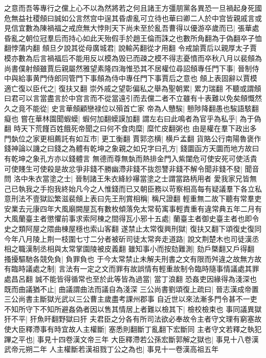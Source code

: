 之意而吾等專行之儻上心不以為然將若之何且諸王方彊朋黨各異恐一旦禍起身死國危無益社稷頠曰誠如公言然宫中逞其昏虐亂可立待也華曰卿二人於中宫皆親戚言或見信宜數為陳禍福之戒庶無大悖則天下尚未至於亂吾曹得以優游卒歲而已|{
	張華處昏亂之朝位冠羣后而持心如此天殆假手於趙王倫而誅之也數所角翻為于偽翻卒子恤翻悖蒲内翻}
頠旦夕說其從母廣城君|{
	說輸芮翻從才用翻}
令戒諭賈后以親厚太子賈模亦數為后言禍福后不能用反以模為毁已而疎之模不得志憂憤而卒秋八月以裴頠為尚書僕射頠雖賈后親屬然雅望素隆四海惟恐其不居權位尋詔頠專任門下事|{
	晉制侍中與給事黄門侍郎同管門下事頠為侍中專任門下事賈后之意也}
頠上表固辭以賈模適亡復以臣代之|{
	復扶又翻}
崇外戚之望彰偏私之舉為聖朝累|{
	累力瑞翻}
不聽或謂頠曰君可以言當盡言於中宫言而不從當遠引而去儻二者不立雖有十表難以免矣頠慨然久之竟不能從|{
	史言華頠顧戀禄位以殞首亡家}
帝為人戇騃|{
	戅陟降翻愚也騃語駭翻癡也}
嘗在華林園聞蝦蟆|{
	蝦何加翻蟆謨加翻}
謂左右曰此鳴者為官乎為私乎|{
	為于偽翻}
時天下荒饉百姓餓死帝聞之曰何不食肉糜|{
	糜忙皮翻粥也}
由是權在羣下政出多門埶位之家更相薦託有如互市|{
	更工衡翻}
賈郭恣横|{
	横戶孟翻}
貨賂公行南陽魯褒作錢神論以譏之曰錢之為體有乾坤之象親之如兄字曰孔方|{
	錢圜函方天圜而地方故曰有乾坤之象孔方亦以錢體言}
無德而尊無埶而熱排金門入紫闥危可使安死可使活貴可使賤生可使殺是故忿爭非錢不勝幽滯非錢不抜怨讐非錢不解令聞非錢不發|{
	聞音問}
洛中朱衣當塗之士|{
	晉制諸王朱衣絳紗襮當塗之士謂當路柄用者}
愛我家兄皆無己已執我之手抱我終始凡今之人惟錢而已又朝臣務以苛察相高每有疑議羣下各立私意刑法不壹獄訟繁滋裴頠上表曰先王刑賞相稱|{
	稱尺證翻}
輕重無二故下聽有常羣吏安業去元康四年大風廟闕屋瓦有數枚傾落免太常荀㝢事輕責重有違常典五年二月有大風蘭臺主者懲懼前事求索阿棟之間得瓦小邪十五處|{
	蘭臺主者御史臺主者也即令史之類阿屋之隈曲棟屋穩也索山客翻}
遂禁止太常復興刑獄|{
	復扶又翻下頌復史復同}
今年八月陵上荆一枝圍七寸二分者被斫司徒太常奔走道路|{
	說文荆楚木也司徒漢丞相之職漢制丞相與太常掌園陵被皮義翻}
雖知事小而按劾難測|{
	劾戶槩翻又戶得翻}
搔擾驅馳各競免負|{
	負罪負也}
于今太常禁止未解夫刑書之文有限而舛違之故無方故有臨時議處之制|{
	言法有一定之文而罪有故誤情有輕重故制令臨時隨事情議處其罪處昌呂翻}
誠不能皆得循常也至於此等皆為過當|{
	當丁浪翻}
恐姦吏因緣得為淺深也既而曲議猶不止|{
	曲議謂曲法而議自為淺深}
三公尚書劉頌復上疏曰|{
	晉志漢成帝置三公尚書主斷獄光武以三公曹主歲盡考課州郡事}
自近世以來法漸多門令甚不一吏不知所守下不知所避姦偽者因以售其情居上者難以檢其下|{
	檢校檢束也}
事同議異獄犴不平|{
	犴魚旰翻野獄曰犴}
夫君臣之分各有所司法欲必奉故令主者守文理有窮塞故使大臣釋滯事有時宜故人主權斷|{
	塞悉則翻斷丁亂翻下宏斷同}
主者守文若釋之執犯蹕之平也|{
	事見十四卷漢文帝三年}
大臣釋滯若公孫宏斷郭解之獄也|{
	事見十八卷漢武帝元朔二年}
人主權斷若漢祖戮丁公之為也|{
	事見十一卷漢高祖五年}
